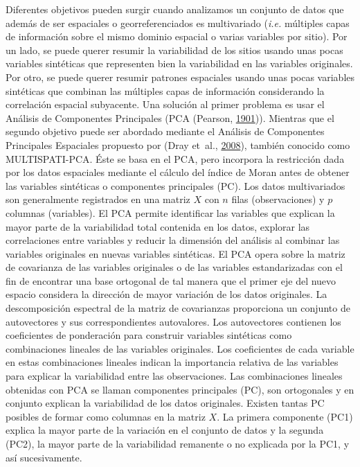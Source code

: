 \documentclass[11pt,b5paper,]{krantz}
\begin{document}
Diferentes objetivos pueden surgir cuando analizamos un conjunto de
datos que además de ser espaciales o georreferenciados es multivariado
(\emph{i.e.} múltiples capas de información sobre el mismo dominio
espacial o varias variables por sitio). Por un lado, se puede querer
resumir la variabilidad de los sitios usando unas pocas variables
sintéticas que representen bien la variabilidad en las variables
originales. Por otro, se puede querer resumir patrones espaciales usando
unas pocas variables sintéticas que combinan las múltiples capas de
información considerando la correlación espacial subyacente. Una
solución al primer problema es usar el Análisis de Componentes
Principales (PCA (Pearson, \protect\hyperlink{ref-F.R.S._1901}{1901})).
Mientras que el segundo objetivo puede ser abordado mediante el Análisis
de Componentes Principales Espaciales propuesto por (Dray et~al.,
\protect\hyperlink{ref-Dray_Sauxefd_Duxe9bias_2008}{2008}), también
conocido como MULTISPATI-PCA. Éste se basa en el PCA, pero incorpora la
restricción dada por los datos espaciales mediante el cálculo del índice
de Moran antes de obtener las variables sintéticas o componentes
principales (PC). Los datos multivariados son generalmente registrados
en una matriz \(X\) con \(n\) filas (observaciones) y \(p\) columnas
(variables). El PCA permite identificar las variables que explican la
mayor parte de la variabilidad total contenida en los datos, explorar
las correlaciones entre variables y reducir la dimensión del análisis al
combinar las variables originales en nuevas variables sintéticas. El PCA
opera sobre la matriz de covarianza de las variables originales o de las
variables estandarizadas con el fin de encontrar una base ortogonal de
tal manera que el primer eje del nuevo espacio considera la dirección de
mayor variación de los datos originales. La descomposición espectral de
la matriz de covarianzas proporciona un conjunto de autovectores y sus
correspondientes autovalores. Los autovectores contienen los
coeficientes de ponderación para construir variables sintéticas como
combinaciones lineales de las variables originales. Los coeficientes de
cada variable en estas combinaciones lineales indican la importancia
relativa de las variables para explicar la variabilidad entre las
observaciones. Las combinaciones lineales obtenidas con PCA se llaman
componentes principales (PC), son ortogonales y en conjunto explican la
variabilidad de los datos originales. Existen tantas PC posibles de
formar como columnas en la matriz \(X\). La primera componente (PC1)
explica la mayor parte de la variación en el conjunto de datos y la
segunda (PC2), la mayor parte de la variabilidad remanente o no
explicada por la PC1, y así sucesivamente.
\end{document}
